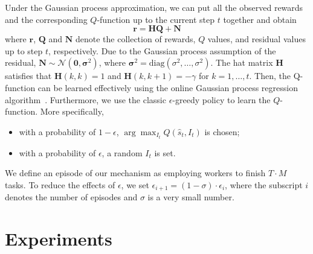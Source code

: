 \documentclass[letterpaper]{article} %
\begin{document}
Under the Gaussian process approximation, we can put all the observed rewards and the corresponding $Q$-function up to the current step $t$ together and obtain
\begin{equation}
\bm{r}=\bm{H}\bm{Q}+\bm{N}
\end{equation}
where $\bm{r}$, $\bm{Q}$ and $\bm{N}$ denote the collection of rewards, $Q$ values, and residual values up to step $t$, respectively.
Due to the Gaussian process assumption of the residual, $\bm{N}\sim \mathcal{N}(\bm{0},\bm{\sigma}^2)$, where $\bm{\sigma}^2=\textrm{diag}(\sigma^2,\ldots,\sigma^2)$.
The hat matrix $\bm{H}$ satisfies that $\bm{H}(k,k)=1$ and $\bm{H}(k,k+1)=-\gamma$ for $k=1,\ldots, t$.
Then, the Q-function can be learned effectively using the online Gaussian process regression algorithm~\cite{engel2005reinforcement}. Furthermore, we use the classic $\epsilon$-greedy policy to learn the $Q$-function. More specifically,
\begin{itemize}
\item with a probability of $1-\epsilon$, $\arg\max_{I_t} Q(\hat{s}_{t}, I_{t})$ is chosen; 
\item with a probability of $\epsilon$, a random $I_t$ is set. 
\end{itemize}
We define an episode of our mechanism as employing workers to finish $T\cdot M$ tasks.
To reduce the effects of $\epsilon$, we set $\epsilon_{i+1}=(1-\sigma)\cdot \epsilon_{i}$, where the subscript $i$ denotes the number of episodes and $\sigma$ is a very small number.


\section{Experiments}
\end{document}
